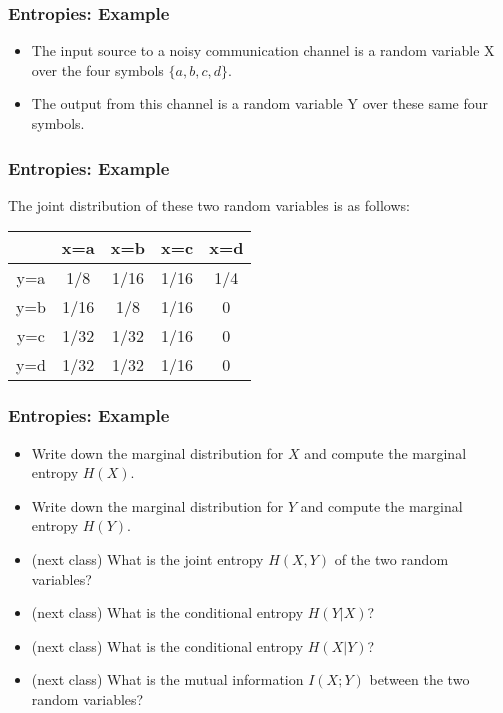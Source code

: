 \documentclass[a4]{beamer}
\begin{document}
\begin{frame}
\frametitle{Entropies: Example}
\begin{itemize}
\item The input source to a noisy communication channel is a random variable X over the
four symbols $\{a, b, c, d\}$. \item  The output from this channel is a random variable Y over these same
four symbols.
\end{itemize}

\end{frame}
\begin{frame}
\frametitle{Entropies: Example}
The joint distribution of these two random variables is as follows:\\ \bigskip
\begin{center}
\begin{tabular}{|c|c|c|c|c|}
\hline
&x=a& x=b & x=c & x=d \\ \hline
y=a &1/8 &1/16 &1/16 &1/4 \\ \hline
y=b &1/16 & 1/8& 1/16& 0 \\ \hline
y=c & 1/32&1/32 & 1/16 & 0\\ \hline
y=d & 1/32& 1/32& 1/16 & 0\\ \hline
\end{tabular}
\end{center}
\end{frame}
\begin{frame}
\frametitle{Entropies: Example}
\begin{itemize}
\item Write down the marginal distribution for $X$ and compute the marginal entropy $H(X)$.
\item Write down the marginal distribution for $Y$ and compute the marginal entropy $H(Y )$.
\item (next class) What is the joint entropy $H(X, Y ) $ of the two random variables?
\item (next class) What is the conditional entropy $H(Y|X)$?
\item (next class) What is the conditional entropy $H(X|Y)$?
\item (next class) What is the mutual information $I(X;Y)$ between the two random variables?
\end{itemize}
\end{frame}
\end{document}
